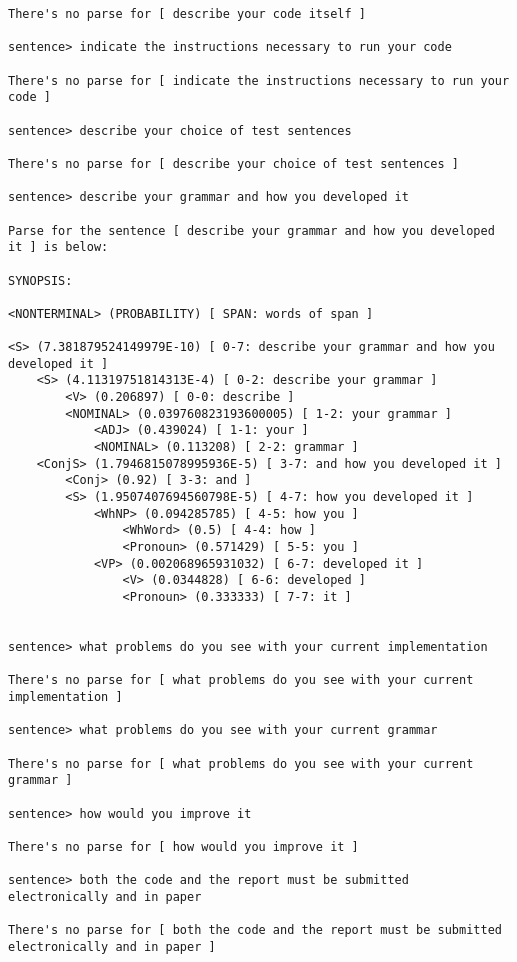 \begin{verbatim}
There's no parse for [ describe your code itself ]

sentence> indicate the instructions necessary to run your code

There's no parse for [ indicate the instructions necessary to run your code ]

sentence> describe your choice of test sentences

There's no parse for [ describe your choice of test sentences ]

sentence> describe your grammar and how you developed it

Parse for the sentence [ describe your grammar and how you developed it ] is below:

SYNOPSIS:

<NONTERMINAL> (PROBABILITY) [ SPAN: words of span ]

<S> (7.381879524149979E-10) [ 0-7: describe your grammar and how you developed it ]
    <S> (4.11319751814313E-4) [ 0-2: describe your grammar ]
        <V> (0.206897) [ 0-0: describe ]
        <NOMINAL> (0.039760823193600005) [ 1-2: your grammar ]
            <ADJ> (0.439024) [ 1-1: your ]
            <NOMINAL> (0.113208) [ 2-2: grammar ]
    <ConjS> (1.7946815078995936E-5) [ 3-7: and how you developed it ]
        <Conj> (0.92) [ 3-3: and ]
        <S> (1.9507407694560798E-5) [ 4-7: how you developed it ]
            <WhNP> (0.094285785) [ 4-5: how you ]
                <WhWord> (0.5) [ 4-4: how ]
                <Pronoun> (0.571429) [ 5-5: you ]
            <VP> (0.002068965931032) [ 6-7: developed it ]
                <V> (0.0344828) [ 6-6: developed ]
                <Pronoun> (0.333333) [ 7-7: it ]


sentence> what problems do you see with your current implementation

There's no parse for [ what problems do you see with your current implementation ]

sentence> what problems do you see with your current grammar

There's no parse for [ what problems do you see with your current grammar ]

sentence> how would you improve it

There's no parse for [ how would you improve it ]

sentence> both the code and the report must be submitted electronically and in paper

There's no parse for [ both the code and the report must be submitted electronically and in paper ]


\end{verbatim}
